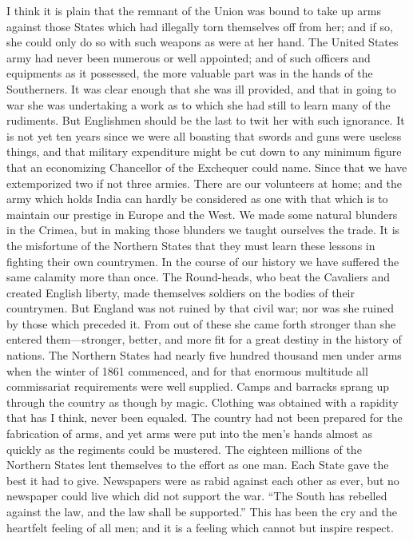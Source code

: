 I think it is plain that the remnant of the Union was bound to take
up arms against those States which had illegally torn themselves
off from her; and if so, she could only do so with such weapons as
were at her hand.  The United States army had never been numerous
or well appointed; and of such officers and equipments as it
possessed, the more valuable part was in the hands of the
Southerners.  It was clear enough that she was ill provided, and
that in going to war she was undertaking a work as to which she had
still to learn many of the rudiments.  But Englishmen should be the
last to twit her with such ignorance.  It is not yet ten years
since we were all boasting that swords and guns were useless
things, and that military expenditure might be cut down to any
minimum figure that an economizing Chancellor of the Exchequer
could name.  Since that we have extemporized two if not three
armies.  There are our volunteers at home; and the army which holds
India can hardly be considered as one with that which is to
maintain our prestige in Europe and the West.  We made some natural
blunders in the Crimea, but in making those blunders we taught
ourselves the trade.  It is the misfortune of the Northern States
that they must learn these lessons in fighting their own
countrymen.  In the course of our history we have suffered the same
calamity more than once.  The Round-heads, who beat the Cavaliers
and created English liberty, made themselves soldiers on the bodies
of their countrymen.  But England was not ruined by that civil war;
nor was she ruined by those which preceded it.  From out of these
she came forth stronger than she entered them---stronger, better,
and more fit for a great destiny in the history of nations.  The
Northern States had nearly five hundred thousand men under arms
when the winter of 1861 commenced, and for that enormous multitude
all commissariat requirements were well supplied.  Camps and
barracks sprang up through the country as though by magic.
Clothing was obtained with a rapidity that has I think, never been
equaled.  The country had not been prepared for the fabrication of
arms, and yet arms were put into the men's hands almost as quickly
as the regiments could be mustered.  The eighteen millions of the
Northern States lent themselves to the effort as one man.  Each
State gave the best it had to give.  Newspapers were as rabid
against each other as ever, but no newspaper could live which did
not support the war.  ``The South has rebelled against the law, and
the law shall be supported.''  This has been the cry and the
heartfelt feeling of all men; and it is a feeling which cannot but
inspire respect.

